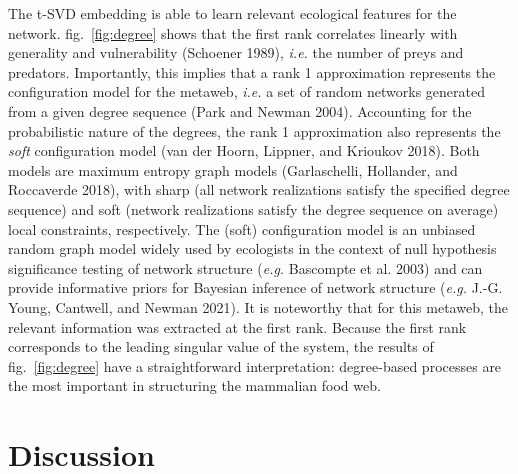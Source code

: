 \documentclass[11pt]{article}
\begin{document}
The t-SVD embedding is able to learn relevant ecological features for
the network. fig.~\ref{fig:degree} shows that the first rank correlates
linearly with generality and vulnerability (Schoener 1989), \emph{i.e.}
the number of preys and predators. Importantly, this implies that a rank
1 approximation represents the configuration model for the metaweb,
\emph{i.e.} a set of random networks generated from a given degree
sequence (Park and Newman 2004). Accounting for the probabilistic nature
of the degrees, the rank 1 approximation also represents the \emph{soft}
configuration model (van der Hoorn, Lippner, and Krioukov 2018). Both
models are maximum entropy graph models (Garlaschelli, Hollander, and
Roccaverde 2018), with sharp (all network realizations satisfy the
specified degree sequence) and soft (network realizations satisfy the
degree sequence on average) local constraints, respectively. The (soft)
configuration model is an unbiased random graph model widely used by
ecologists in the context of null hypothesis significance testing of
network structure (\emph{e.g.} Bascompte et al. 2003) and can provide
informative priors for Bayesian inference of network structure
(\emph{e.g.} J.-G. Young, Cantwell, and Newman 2021). It is noteworthy
that for this metaweb, the relevant information was extracted at the
first rank. Because the first rank corresponds to the leading singular
value of the system, the results of fig.~\ref{fig:degree} have a
straightforward interpretation: degree-based processes are the most
important in structuring the mammalian food web.

\hypertarget{discussion}{%
\section{Discussion}\label{discussion}}
\end{document}
